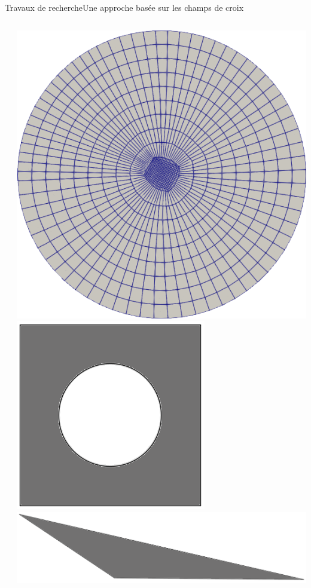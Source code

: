 \documentclass[compress,10pt,aspectratio=169]{beamer}
\begin{document}
\begin{frame}{Travaux de recherche}{Une approche basée sur les champs de croix}
\begin{columns}
\begin{column}{0.55\textwidth}
    \end{column}
    \begin{column}{0.45\textwidth}
        \centering
        \vspace{-0.15cm}
        \includegraphics[scale=0.12]{images/new_cercle.png}
        \hspace{0.6cm}
        \includegraphics[scale=0.28]{images/carreTrou.png}
        \\\vspace{0.2cm}
        \includegraphics[scale=0.18]{images/triangle_etire.png}

\end{column}
\end{columns}
\end{frame}
\end{document}
